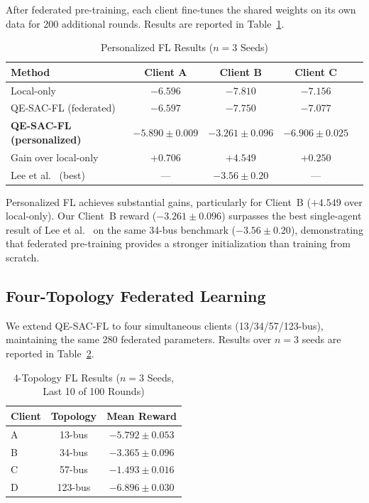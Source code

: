 \documentclass[journal]{IEEEtran}
\begin{document}
After federated pre-training, each client fine-tunes the shared weights
on its own data for 200 additional rounds. Results are reported in
Table~\ref{tab:personalized}.

\begin{table}[t]
\centering
\caption{Personalized FL Results ($n=3$ Seeds)}
\label{tab:personalized}
\begin{tabular}{lcccc}
\toprule
Method & Client A & Client B & Client C \\
\midrule
Local-only           & $-6.596$ & $-7.810$ & $-7.156$ \\
QE-SAC-FL (federated)& $-6.597$ & $-7.750$ & $-7.077$ \\
\textbf{QE-SAC-FL (personalized)} & $\mathbf{-5.890 \pm 0.009}$ & $\mathbf{-3.261 \pm 0.096}$ & $\mathbf{-6.906 \pm 0.025}$ \\
\midrule
Gain over local-only & $+0.706$ & $+4.549$ & $+0.250$ \\
Lee et al.\ \cite{lee2022graph} (best) & --- & $-3.56 \pm 0.20$ & --- \\
\bottomrule
\end{tabular}
\end{table}

Personalized FL achieves substantial gains, particularly for Client~B
($+4.549$ over local-only). Our Client~B reward ($-3.261 \pm 0.096$)
surpasses the best single-agent result of Lee et al.\ \cite{lee2022graph}
on the same 34-bus benchmark ($-3.56 \pm 0.20$), demonstrating that
federated pre-training provides a stronger initialization than training
from scratch.

\subsection{Four-Topology Federated Learning}

We extend QE-SAC-FL to four simultaneous clients (13/34/57/123-bus),
maintaining the same 280 federated parameters. Results over $n=3$ seeds
are reported in Table~\ref{tab:4topo}.

\begin{table}[t]
\centering
\caption{4-Topology FL Results ($n=3$ Seeds, Last 10 of 100 Rounds)}
\label{tab:4topo}
\begin{tabular}{lcc}
\toprule
Client & Topology & Mean Reward \\
\midrule
A & 13-bus  & $-5.792 \pm 0.053$ \\
B & 34-bus  & $-3.365 \pm 0.096$ \\
C & 57-bus  & $-1.493 \pm 0.016$ \\
D & 123-bus & $-6.896 \pm 0.030$ \\
\bottomrule
\end{tabular}
\end{table}
\end{document}
